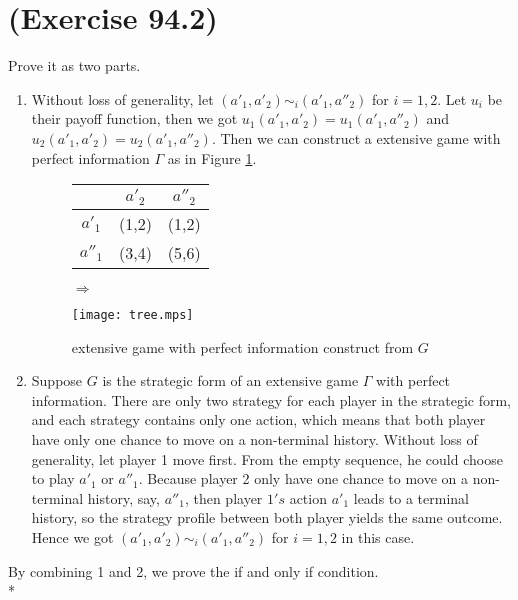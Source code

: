 \documentclass[a4paper,12pt]{article}
\begin{document}
\section{(Exercise 94.2)}
Prove it as two parts.
\begin{enumerate}
\item
Without loss of generality, let $(a'_1,a'_2)\sim_i (a'_1,a''_2)$ for
$i=1,2$. Let $u_i$ be their payoff function, then we got
$u_1(a'_1,a'_2)=u_1(a'_1,a''_2)$ and
$u_2(a'_1,a'_2)=u_2(a'_1,a''_2)$. Then we can construct a extensive
game with perfect information $\Gamma$ as in Figure
\ref{fig:extgame}.
\begin{figure}[!ht]
  \begin{minipage}[c]{0.5\textwidth}
    \centering
    \begin{tabular}{|c|c|c|}
    \hline
            & $a'_2$ & $a''_2$ \\\hline
    $a'_1$  & (1,2) & (1,2) \\\hline
    $a''_1$ & (3,4) & (5,6) \\\hline
    \end{tabular}
  \end{minipage}%
  \begin{minipage}[c]{0.1\textwidth}
    $\Rightarrow$
  \end{minipage}
  \begin{minipage}[c]{0.3\textwidth}
    \centering
    \texttt{[image: tree.mps]}
  \end{minipage}
\caption{extensive game with perfect information construct from $G$}
\label{fig:extgame}
\end{figure}

\item
Suppose $G$ is the strategic form of an extensive game $\Gamma$ with
perfect information. There are only two strategy for each player in
the strategic form, and each strategy contains only one action,
which means that both player have only one chance to move on a
non-terminal history. Without loss of generality, let player 1 move
first. From the empty sequence, he could choose to play $a'_1$ or
$a''_1$. Because player 2 only have one chance to move on a
non-terminal history, say, $a''_1$, then player $1's$ action $a'_1$
leads to a terminal history, so the strategy profile between both
player yields the same outcome. Hence we got $(a'_1,a'_2)\sim_i
(a'_1,a''_2)$ for $i=1,2$ in  this case.
\end{enumerate}
By combining 1 and 2, we prove the if and only if condition. \\*
\end{document}
